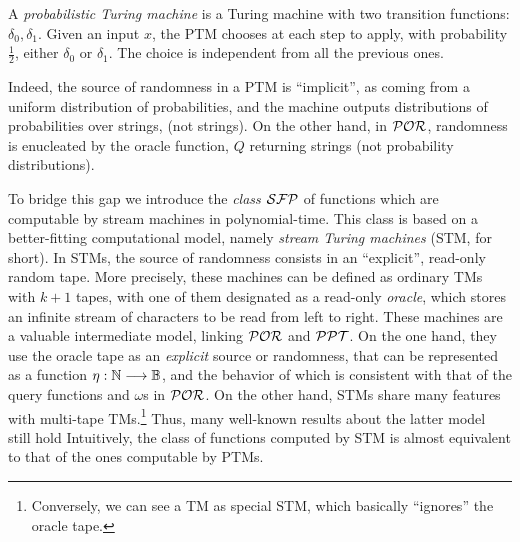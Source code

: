 \begin{defn}
A \emph{probabilistic Turing machine}
is a Turing machine with two transition functions: $\delta_0,\delta_1$.
%
Given an input $x$, the PTM chooses at each step
to apply, with probability $\frac{1}{2}$,
either $\delta_0$ or $\delta_1$.
%
The choice is independent from all the previous ones.
\end{defn}
%
%
%
\noindent
Indeed, the source of randomness in a PTM is ``implicit'',
as coming from a uniform distribution of
probabilities, and the machine
outputs distributions of probabilities over strings,
(not strings).
%
On the other hand, in $\mathcal{POR}$,
randomness is enucleated by the oracle function,
$Q$
returning strings (not probability distributions).


To bridge this gap %
we introduce the \emph{class $\mathcal{SFP}$}
of functions which are computable by
stream machines in polynomial-time.
%
This class is based on
a better-fitting computational model,
namely \emph{stream Turing machines}
(STM, for short).
%
In STMs, the source of randomness
consists in an ``explicit'', read-only
random tape.
%
More precisely, these machines can be defined
as ordinary
TMs with $k+1$ tapes,
with one of them designated as a read-only \emph{oracle},
which stores an infinite stream of characters to
be read from left to right.
%
These machines are a valuable intermediate
model, linking $\mathcal{POR}$ and $\mathcal{PPT}$.
%
On the one hand, they use the oracle tape as an \emph{explicit}
source or randomness,
that can be represented
as a function $\eta:\mathbb{N} \longrightarrow \mathbb{B}$,
and the behavior of which
is consistent with that of
the query functions and $\omega$s in $\mathcal{POR}$.
%
On the other hand, STMs share many features with
multi-tape TMs.\footnote{Conversely,
we can see
a TM as special STM, which basically ``ignores'' the
oracle tape.}
%
Thus, many well-known results
about the latter model still hold
%
Intuitively, the class of functions computed by STM
is almost equivalent to that of the ones computable
by PTMs.



